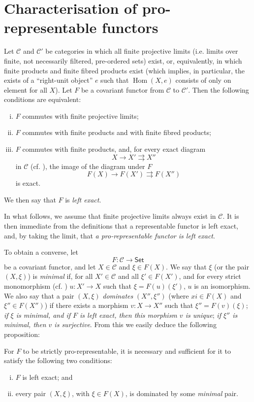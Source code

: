 \documentclass{article}
\theoremstyle{plain}
\newenvironment{proposition}[1]
  {\renewcommand\theinnercustomproposition{#1}\innercustomproposition}
  {\endinnercustomproposition}
\theoremstyle{definition}
\newcommand{\cat}[1]{{\mathcal{#1}}}
\newcommand{\Set}{\mathsf{Set}}
\DeclareMathOperator{\Hom}{Hom}
\newcommand{\oldpage}[1]{\marginpar{\footnotesize$\Big\vert$ \textit{p.~#1}}}
\begin{document}
\section{Characterisation of pro-representable functors}
\label{A.3}

Let $\cat{C}$ and $\cat{C}'$ be categories in which all finite projective limits (i.e. limits over finite, not necessarily filtered, pre-ordered sets) exist, or, equivalently, in which finite products and finite fibred products exist (which implies, in particular, the exists of a ``right-unit object'' $e$ such that $\Hom(X,e)$ consists of only on element for all $X$).
Let $F$ be a covariant functor from $\cat{C}$ to $\cat{C}'$.
Then the following conditions are equivalent:
\begin{enumerate}[(i)]
  \item $F$ commutes with finite projective limits;
  \item $F$ commutes with finite products and with finite fibred products;
  \item $F$ commutes with finite products, and, for every exact diagram
    \[
      X\to X'\rightrightarrows X''
    \]
    in $\cat{C}$ (cf. \cite[A, Definition 2.1]{3}), the image of the diagram under $F$
    \[
      F(X)\to F(X')\rightrightarrows F(X'')
    \]
    is exact.
\end{enumerate}
We then say that $F$ is \emph{left exact}.

In what follows, we assume that finite projective limits always exist in $\cat{C}$.
It is then immediate from the definitions that a representable functor is left exact, and, by taking the limit, that \emph{a pro-representable functor is left exact}.

To obtain a converse, let
\[
  F\colon \cat{C} \to \Set
\]
be a covariant functor, and let $X\in\cat{C}$ and $\xi\in F(X)$.
We say that $\xi$ (or the pair
\oldpage{195-06}
$(X,\xi)$) is \emph{minimal} if, for all $X'\in\cat{C}$ and all $\xi'\in F(X')$, and for every strict monomorphism (cf. \cite[A, \S2]{3}) $u\colon X'\to X$ such that $\xi=F(u)(\xi')$, $u$ is an isomorphism.
We also say that a pair $(X,\xi)$ \emph{dominates} $(X'',\xi'')$ (where $xi\in F(X)$ and $\xi''\in F(X'')$) if there exists a morphism $v\colon X\to X''$ such that $\xi''=F(v)(\xi)$;
\emph{if $\xi$ is minimal, and if $F$ is left exact, then this morphism $v$ is unique};
\emph{if $\xi''$ is minimal, then $v$ is surjective}.
From this we easily deduce the following proposition:

\begin{proposition}{3.1}
\label{A.3-proposition1}
  For $F$ to be strictly pro-representable, it is necessary and sufficient for it to satisfy the following two conditions:
  \begin{enumerate}[(i)]
    \item $F$ is left exact; and
    \item every pair $(X,\xi)$, with $\xi\in F(X)$, is dominated by some \emph{minimal} pair.
  \end{enumerate}
\end{proposition}
\end{document}
